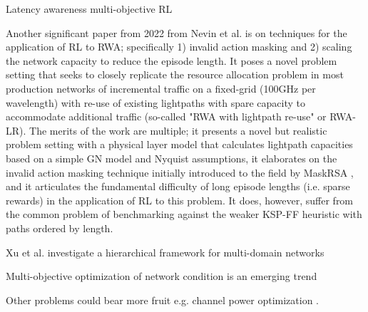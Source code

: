 \cite{hernandez-chulde_experimental_2023} Latency awareness
\cite{nallaperuma_interpreting_2023} multi-objective RL


Another significant paper from 2022 from Nevin et al. \cite{nevin_techniques_2022}  is on techniques for the application of RL to RWA; specifically 1) invalid action masking and 2) scaling the network capacity to reduce the episode length. It poses a novel problem setting that seeks to closely replicate the resource allocation problem in most production networks of incremental traffic on a fixed-grid (100GHz per wavelength) with re-use of existing lightpaths with spare capacity to accommodate additional traffic (so-called "RWA with lightpath re-use" or RWA-LR). The merits of the work are multiple; it presents a novel but realistic problem setting with a physical layer model that calculates lightpath capacities based on a simple GN model and Nyquist assumptions, it elaborates on the invalid action masking technique initially introduced to the field by MaskRSA \cite{shimoda_mask_2021}, and it articulates the fundamental difficulty of long episode lengths (i.e. sparse rewards) in the application of RL to this problem. It does, however, suffer from the common problem of benchmarking against the weaker KSP-FF heuristic with paths ordered by length. %


Xu et al. investigate a hierarchical framework for multi-domain networks \cite{xu_hierarchical_2023}

Multi-objective optimization of network condition is an emerging trend \cite{cheng_ptrnet-rsa_2024,xie_physical_2024,teng_deep-reinforcement-learning-based_2024}

Other problems could bear more fruit e.g. channel power optimization \cite{arpanaei_launch_2023,xiao_channel_2024}.
